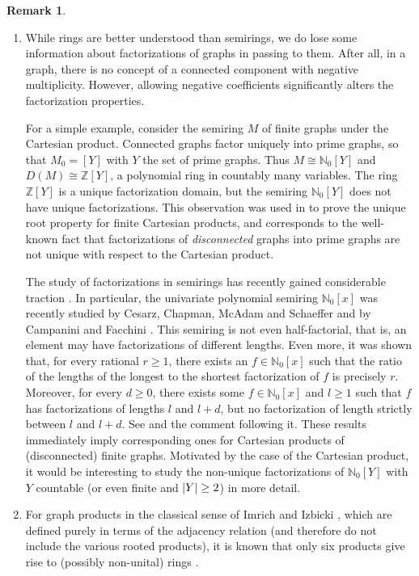 \documentclass{amsart}
\theoremstyle{plain}
\theoremstyle{definition}
\newtheorem{remark}[thm]{Remark}
\newcommand{\bN}{\mathbb N}
\newcommand{\bZ}{\mathbb Z}
\DeclarePairedDelimiter{\card}{\lvert}{\rvert}
\begin{document}
\begin{remark}
  \begin{enumerate}
    \item
  While rings are better understood than semirings, we do lose some information about factorizations of graphs in passing to them.
  After all, in a graph, there is no concept of a connected component with negative multiplicity.
  However, allowing negative coefficients significantly alters the factorization properties.

  For a simple example, consider the semiring $M$ of finite graphs under the Cartesian product.
  Connected graphs factor uniquely into prime graphs, so that $M_0=[Y]$ with $Y$ the set of prime graphs.
  Thus $M \cong \bN_0[Y]$ and $D(M) \cong \bZ[Y]$, a polynomial ring in countably many variables.
  The ring $\bZ[Y]$ is a unique factorization domain, but the semiring $\bN_0[Y]$ does not have unique factorizations.
  This observation was used in \cite{fele07} to prove the unique root property for finite Cartesian products, and corresponds to the well-known fact that factorizations of \emph{disconnected} graphs into prime graphs are not unique with respect to the Cartesian product.

  The study of factorizations in semirings has recently gained considerable traction \cite{baeth-gotti20,correamorris-gotti22,chapman-polo23,gotti-polo23,gotti-polo23b,jiang-li-zhu23}.
  In particular, the univariate polynomial semiring $\bN_0[x]$ was recently studied by Cesarz, Chapman, McAdam and Schaeffer \cite{cesarz-chapman-mcadam-schaeffer09} and by Campanini and Facchini \cite{campanini-facchini19}.
  This semiring is not even half-factorial, that is, an element may have factorizations of different lengths.
  Even more, it was shown that, for every rational $r \ge 1$, there exists an $f \in \bN_0[x]$ such that the ratio of the lengths of the longest to the shortest factorization of $f$ is precisely $r$. Moreover, for every $d \ge 0$, there exists some $f\in \bN_0[x]$ and $l \ge 1$ such that $f$ has factorizations of lengths $l$ and $l+d$, but no factorization of length strictly between $l$ and $l+d$. See \cite[Theorem 2.3]{cesarz-chapman-mcadam-schaeffer09} and the comment following it.
  These results immediately imply corresponding ones for Cartesian products of (disconnected) finite graphs.
  Motivated by the case of the Cartesian product, it would be interesting to study the non-unique factorizations of $\bN_0[Y]$ with $Y$ countable (or even finite and $\card{Y} \ge 2$) in more detail.


  \item For graph products in the classical sense of Imrich and Izbicki \cite{imiz1975}, which are defined purely in terms of the adjacency relation (and therefore do not include the various rooted products), it is known that only six products give rise to (possibly non-unital) rings \cite[Theorem 2]{campanelli-friasarmenta-martinezmorales17}.
  \end{enumerate}
\end{remark}
\end{document}
